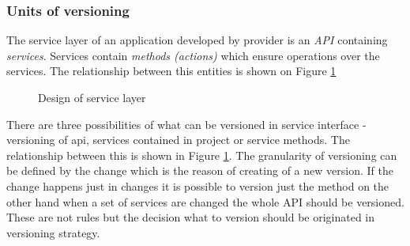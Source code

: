 \subsubsection{Units of versioning}
\label{sec:units}

The service layer of an application developed by provider is an \emph{API} containing \emph{services}. Services contain \emph{methods (actions)} which ensure operations over the services. The relationship between this entities is shown on Figure \ref{fig:service-layer-design}

\begin{figure}[htp] 
\caption{Design of service layer}
\label{fig:service-layer-design}
\end{figure} 


There are three possibilities of what can be versioned in service interface - versioning of \gls{api}, services contained in project or service methods. The relationship between this is shown in Figure \ref{fig:service-layer-design}. The granularity of versioning can be defined by the change which is the reason of creating of a new version. If the change happens just in changes it is possible to version just the method on the other hand when a set of services are changed the whole API should be versioned. These are not rules but the decision what to version should be originated in versioning strategy.

